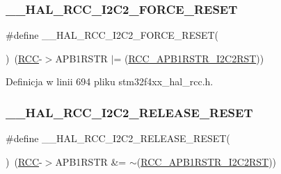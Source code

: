 \subsubsection{\texorpdfstring{\+\_\+\+\_\+\+H\+A\+L\+\_\+\+R\+C\+C\+\_\+\+I2\+C2\+\_\+\+F\+O\+R\+C\+E\+\_\+\+R\+E\+S\+ET}{\_\_HAL\_RCC\_I2C2\_FORCE\_RESET}}
{\footnotesize\ttfamily \#define \+\_\+\+\_\+\+H\+A\+L\+\_\+\+R\+C\+C\+\_\+\+I2\+C2\+\_\+\+F\+O\+R\+C\+E\+\_\+\+R\+E\+S\+ET(\begin{DoxyParamCaption}{ }\end{DoxyParamCaption})~(\hyperlink{group___peripheral__declaration_ga74944438a086975793d26ae48d5882d4}{R\+CC}-\/$>$A\+P\+B1\+R\+S\+TR $\vert$= (\hyperlink{group___peripheral___registers___bits___definition_ga412d59407e5dad43cf8ae1ea6f8bc5c3}{R\+C\+C\+\_\+\+A\+P\+B1\+R\+S\+T\+R\+\_\+\+I2\+C2\+R\+ST}))}



Definicja w linii 694 pliku stm32f4xx\+\_\+hal\+\_\+rcc.\+h.

\mbox{\label{group___r_c_c___a_p_b1___force___release___reset_ga2fa8cc909b285813af86c253ec110356}} 
\subsubsection{\texorpdfstring{\+\_\+\+\_\+\+H\+A\+L\+\_\+\+R\+C\+C\+\_\+\+I2\+C2\+\_\+\+R\+E\+L\+E\+A\+S\+E\+\_\+\+R\+E\+S\+ET}{\_\_HAL\_RCC\_I2C2\_RELEASE\_RESET}}
{\footnotesize\ttfamily \#define \+\_\+\+\_\+\+H\+A\+L\+\_\+\+R\+C\+C\+\_\+\+I2\+C2\+\_\+\+R\+E\+L\+E\+A\+S\+E\+\_\+\+R\+E\+S\+ET(\begin{DoxyParamCaption}{ }\end{DoxyParamCaption})~(\hyperlink{group___peripheral__declaration_ga74944438a086975793d26ae48d5882d4}{R\+CC}-\/$>$A\+P\+B1\+R\+S\+TR \&= $\sim$(\hyperlink{group___peripheral___registers___bits___definition_ga412d59407e5dad43cf8ae1ea6f8bc5c3}{R\+C\+C\+\_\+\+A\+P\+B1\+R\+S\+T\+R\+\_\+\+I2\+C2\+R\+ST}))}



